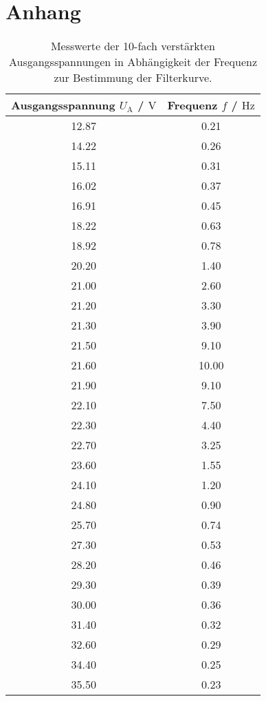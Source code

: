 \section{Anhang}

\begin{table}
    \caption{Messwerte der 10-fach verstärkten Ausgangsspannungen in Abhängigkeit der Frequenz zur Bestimmung der Filterkurve.}
    \centering
    \label{tab:filterkurvewerte}
    \begin{tabular}{c c }
        \toprule
        Ausgangsspannung $U_{\text{A}}$ / $\si{\volt}$ & Frequenz $f$ / $\si{\hertz}$ \\
        \midrule
        12.87  &         0.21\\
        14.22  &         0.26\\
        15.11  &         0.31\\
        16.02  &         0.37\\
        16.91  &         0.45\\
        18.22  &         0.63\\
        18.92  &         0.78\\
        20.20  &         1.40\\
        21.00  &         2.60\\
        21.20  &         3.30\\
        21.30  &         3.90\\
        21.50  &         9.10\\
        21.60  &         10.00\\
        21.90  &         9.10\\
        22.10  &         7.50\\
        22.30  &         4.40\\
        22.70  &         3.25\\
        23.60  &         1.55\\
        24.10  &         1.20\\
        24.80  &         0.90\\
        25.70  &         0.74\\
        27.30  &         0.53\\
        28.20  &         0.46\\
        29.30  &         0.39\\
        30.00  &         0.36\\
        31.40  &         0.32\\
        32.60  &         0.29\\
        34.40  &         0.25\\
        35.50  &         0.23\\
        \bottomrule    
    \end{tabular}
\end{table}

